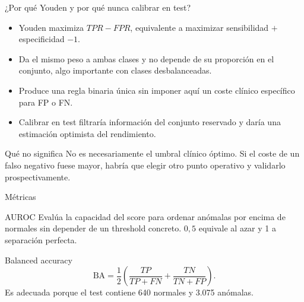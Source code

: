 \documentclass[10pt,aspectratio=169]{beamer}
\begin{document}
\begin{frame}{¿Por qué Youden y por qué nunca calibrar en test?}
  \begin{itemize}
    \item Youden maximiza $TPR-FPR$, equivalente a maximizar
          sensibilidad $+$ especificidad $-1$.
    \item Da el mismo peso a ambas clases y no depende de su proporción en el
          conjunto, algo importante con clases desbalanceadas.
    \item Produce una regla binaria única sin imponer aquí un coste clínico
          específico para FP o FN.
    \item Calibrar en test filtraría información del conjunto reservado y daría
          una estimación optimista del rendimiento.
  \end{itemize}

  \begin{alertblock}{Qué no significa}
    No es necesariamente el umbral clínico óptimo. Si el coste de un falso
    negativo fuese mayor, habría que elegir otro punto operativo y validarlo
    prospectivamente.
  \end{alertblock}
\end{frame}

\begin{frame}{Métricas}
  \begin{block}{AUROC}
    Evalúa la capacidad del score para ordenar anómalas por encima de normales
    sin depender de un threshold concreto. $0{,}5$ equivale al azar y 1 a
    separación perfecta.
  \end{block}

  \begin{block}{Balanced accuracy}
    \[
      \mathrm{BA}=\frac{1}{2}
      \left(\frac{TP}{TP+FN}+\frac{TN}{TN+FP}\right).
    \]
    Es adecuada porque el test contiene 640 normales y 3.075 anómalas.
  \end{block}
\end{frame}
\end{document}
